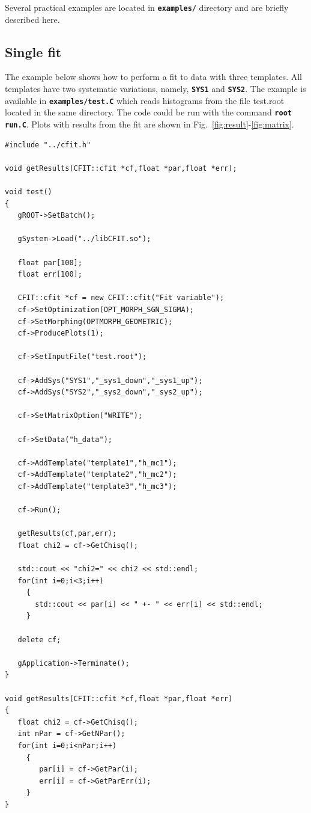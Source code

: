 \documentclass[12pt]{article}
\newcommand\verbbfb[1]{\textcolor[rgb]{0,0,0}{\texttt{\textbf{#1}}}}
\begin{document}
Several practical examples are located in \verbbfb{examples/} directory and are briefly
described here.

\subsection{Single fit}

The example below shows how to perform a fit to data with three
templates. All templates have two systematic variations, namely,
\verbbfb{SYS1} and \verbbfb{SYS2}. The example is available in
\verbbfb{examples/test.C} which reads histograms from the file test.root located
in the same directory. The code could be run with the command \verbbfb{root
run.C}. Plots with results from the fit are shown in
Fig.~\ref{fig:result}-\ref{fig:matrix}.

\begin{verbatim}
#include "../cfit.h"

void getResults(CFIT::cfit *cf,float *par,float *err);

void test()
{
   gROOT->SetBatch();
   
   gSystem->Load("../libCFIT.so");

   float par[100];
   float err[100];
   
   CFIT::cfit *cf = new CFIT::cfit("Fit variable");
   cf->SetOptimization(OPT_MORPH_SGN_SIGMA);
   cf->SetMorphing(OPTMORPH_GEOMETRIC);
   cf->ProducePlots(1);
   
   cf->SetInputFile("test.root");

   cf->AddSys("SYS1","_sys1_down","_sys1_up");
   cf->AddSys("SYS2","_sys2_down","_sys2_up");

   cf->SetMatrixOption("WRITE");
   
   cf->SetData("h_data");
   
   cf->AddTemplate("template1","h_mc1");
   cf->AddTemplate("template2","h_mc2");
   cf->AddTemplate("template3","h_mc3");

   cf->Run();
   
   getResults(cf,par,err);
   float chi2 = cf->GetChisq();
   
   std::cout << "chi2=" << chi2 << std::endl;
   for(int i=0;i<3;i++)
     {
       std::cout << par[i] << " +- " << err[i] << std::endl;
     }   

   delete cf;
   
   gApplication->Terminate();
}

void getResults(CFIT::cfit *cf,float *par,float *err)
{   
   float chi2 = cf->GetChisq();
   int nPar = cf->GetNPar();
   for(int i=0;i<nPar;i++)
     {
        par[i] = cf->GetPar(i);
        err[i] = cf->GetParErr(i);	
     }
}
\end{verbatim}
\end{document}
